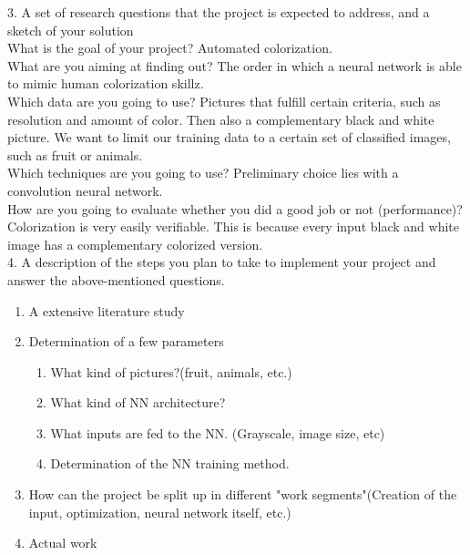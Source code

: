 3. A set of research questions that the project is expected to address, and a sketch of your solution\\
What is the goal of your project? Automated colorization.\\
What are you aiming at finding out? The order in which a neural network is able to mimic human colorization skillz. \\
Which data are you going to use? Pictures that fulfill certain criteria, such as resolution and amount of color. Then also a complementary black and white picture.
We want to limit our training data to a certain set of classified images, such as fruit or animals.\\
Which techniques are you going to use? Preliminary choice lies with a convolution neural network.\\
How are you going to evaluate whether you did a good job or not (performance)? Colorization is very easily verifiable. This is because every input black and white image has a complementary colorized version.\\
4. A description of the steps you plan to take to implement your project and answer the above-mentioned questions. \\
\begin{enumerate}
\item	A extensive literature study
\item	Determination of a few parameters
	\begin{enumerate}
		\item What kind of pictures?(fruit, animals, etc.)
		\item What kind of NN architecture? 
		\item What inputs are fed to the NN. (Grayscale, image size, etc)
		\item Determination of the NN training method. 
	\end{enumerate}

\item How can the project be split up in different "work segments"(Creation of the input, optimization, neural network itself, etc.)
\item Actual work

\end{enumerate}		
